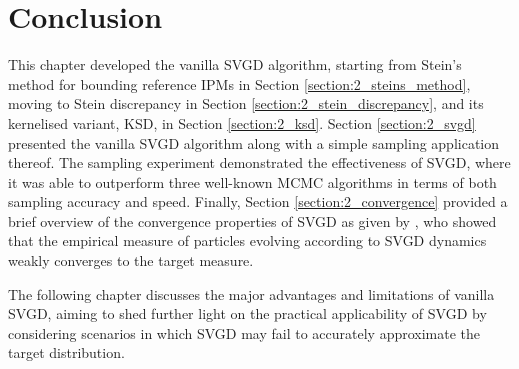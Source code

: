 \section{Conclusion}
\label{section:conclusion}

This chapter developed the vanilla SVGD algorithm, starting from Stein's method for bounding reference IPMs in Section \ref{section:2_steins_method}, moving to Stein discrepancy in Section \ref{section:2_stein_discrepancy}, and its kernelised variant, KSD, in Section \ref{section:2_ksd}. Section \ref{section:2_svgd} presented the vanilla SVGD algorithm along with a simple sampling application thereof. The sampling experiment demonstrated the effectiveness of SVGD, where it was able to outperform three well-known MCMC algorithms in terms of both sampling accuracy and speed. Finally, Section \ref{section:2_convergence} provided a brief overview of the convergence properties of SVGD as given by \citet{liu_svgd_gf}, who showed that the empirical measure of particles evolving according to SVGD dynamics weakly converges to the target measure.

The following chapter discusses the major advantages and limitations of vanilla SVGD, aiming to shed further light on the practical applicability of SVGD by considering scenarios in which SVGD may fail to accurately approximate the target distribution.





